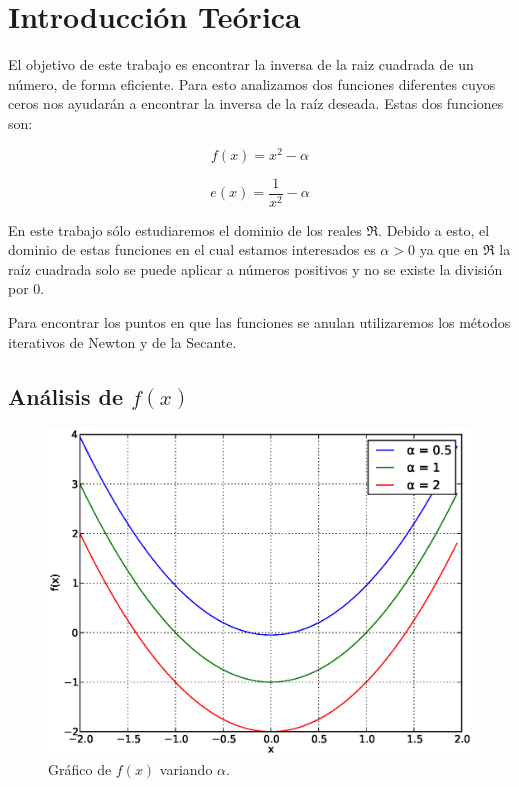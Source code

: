 \section{Introducción Teórica}

El objetivo de este trabajo es encontrar la inversa de la raiz cuadrada de un
número, de forma eficiente. Para esto analizamos dos funciones diferentes cuyos
ceros nos ayudarán a encontrar la inversa de la raíz deseada. Estas dos
funciones son:

\begin{equation}\label{f_x}
    f(x) = x^2 - \alpha
\end{equation}

\begin{equation}\label{e_x}
    e(x) = \frac{1}{x^2} - \alpha
\end{equation}

En este trabajo sólo estudiaremos el dominio de los reales $\Re$. Debido
a esto, el dominio de estas funciones en el cual estamos interesados es $\alpha
> 0$ ya que en $\Re$ la raíz cuadrada solo se puede aplicar a números
positivos y no se existe la división por $0$.

Para encontrar los puntos en que las funciones se anulan utilizaremos los
métodos iterativos de Newton y de la Secante.

\subsection{Análisis de $f(x)$}\label{sec:analisis_f_x}

\begin{figure}[h]
  \begin{center}
    \includegraphics[scale=0.5]{graficos/new/f_x.eps}
    \caption{\label{fig:f_x} Gráfico de $f(x)$ variando $\alpha$.}
  \end{center}
\end{figure}

